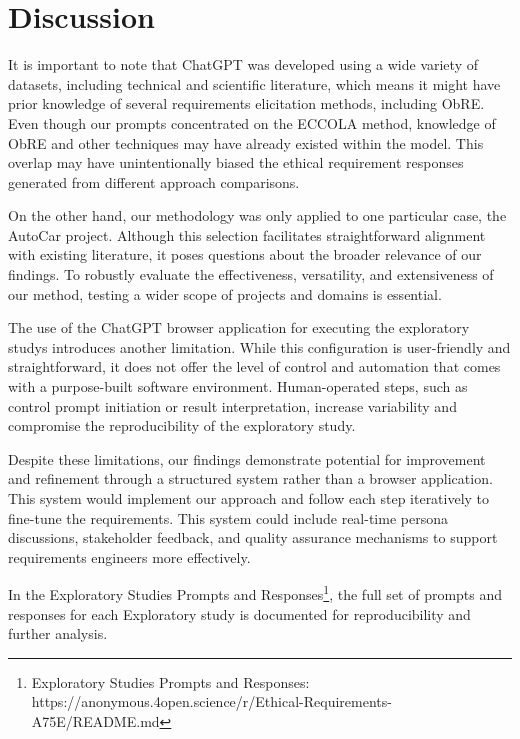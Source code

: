 \section{Discussion}
It is important to note that ChatGPT was developed using a wide variety of datasets, including technical and scientific literature, which means it might have prior knowledge of several requirements elicitation methods, including ObRE. Even though our prompts concentrated on the ECCOLA method, knowledge of ObRE and other techniques may have already existed within the model. This overlap may have unintentionally biased the ethical requirement responses generated from different approach comparisons.

On the other hand, our methodology was only applied to one particular case, the AutoCar project. Although this selection facilitates straightforward alignment with existing literature, it poses questions about the broader relevance of our findings. To robustly evaluate the effectiveness, versatility, and extensiveness of our method, testing a wider scope of projects and domains is essential.

The use of the ChatGPT browser application for executing the exploratory studys introduces another limitation. While this configuration is user-friendly and straightforward, it does not offer the level of control and automation that comes with a purpose-built software environment. Human-operated steps, such as control prompt initiation or result interpretation, increase variability and compromise the reproducibility of the exploratory study.

Despite these limitations, our findings demonstrate potential for improvement and refinement through a structured system rather than a browser application. This system would implement our approach and follow each step iteratively to fine-tune the requirements. This system could include real-time persona discussions, stakeholder feedback, and quality assurance mechanisms to support requirements engineers more effectively. 

In the Exploratory Studies Prompts and Responses\footnote{Exploratory Studies Prompts and Responses: https://anonymous.4open.science/r/Ethical-Requirements-A75E/README.md}, the full set of prompts and responses for each Exploratory study is documented for reproducibility and further analysis.
